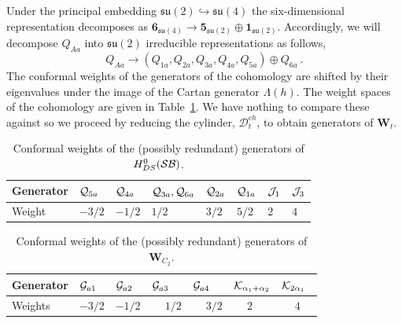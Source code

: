 \documentclass[a4paper]{article}
\def\BB{{\cal B}}
\def\GG{{\cal G}}
\def\JJ{{\cal J}}
\def\KK{{\cal K}}
\def\QQ{{\cal Q}}
\def\SS{{\cal S}}
\def\suf{\mathfrak{su}}
\def\D{\mathcal{D}^{ch}}
\def\W{\mathbf{W}}
\begin{document}
Under the principal embedding $\suf(2)\hookrightarrow\suf(4)$ the six-dimensional representation decomposes as $\mathbf{6}_{\suf(4)}\to\mathbf{5}_{\suf(2)}\oplus \mathbf{1}_{\suf(2)}$. Accordingly, we will decompose $Q_{Aa}$ into $\suf(2)$ irreducible representations as follows,
\begin{equation}
	Q_{Aa} \rightarrow \left(Q_{1a} , Q_{2a}, Q_{3a}, Q_{4a}, Q_{5a} \right) \oplus Q_{6a}~.
\end{equation}
The conformal weights of the generators of the cohomology are shifted by their eigenvalues under the image of the Cartan generator $\Lambda(h)$. The weight spaces of the cohomology are given in Table~\ref{tab:D3-DS}. We have nothing to compare these against so we proceed by reducing the cylinder, $\D_t$, to obtain generators of $\W_t$.

\begin{table}[t!]
\centering
\renewcommand{\arraystretch}{1.25}
\begin{tabular}{|>{\centering}m{2cm} | >{\centering}m{1cm} | >{\centering}m{1cm} | >{\centering}m{1.5cm} | >{\centering}m{1cm} | >{\centering}m{1cm} | >{\centering}m{1cm} |>{\centering\arraybackslash}m{1cm} |}
\hline
Generator & $\QQ_{5a}$ & $\QQ_{4a}$ & $\QQ_{3a},\QQ_{6a}$ & $\QQ_{2a}$ & $\QQ_{1a}$ & $\JJ_1$ & $\JJ_3$ \\
\hline
Weight & $-3/2$ & $-1/2$ & $1/2$ & $3/2$ & $5/2$& $2$ & $4$\\
\hline
\end{tabular}
\caption{Conformal weights of the (possibly redundant) generators of $H^0_{DS}(\SS\BB)$.}
\label{tab:D3-DS}
\end{table}

\begin{table}[b!]
\renewcommand{\arraystretch}{1.25}
\centering
\begin{tabular}{|>{\centering}m{2.5cm} | >{\centering}m{1.5cm} | >{\centering}m{1.5cm} | >{\centering}m{1.5cm} | >{\centering}m{1.5cm} | >{\centering}m{1.5cm} | >{\centering\arraybackslash}m{1.5cm} |}
\hline
Generator & $\GG_{a1}$ & $\GG_{a2}$ & $\GG_{a3}$ & $\GG_{a4}$ & $\KK_{\alpha_1+\alpha_2}$ & $\KK_{2\alpha_1}$ \\
\hline
Weights & $-3/2$ & $-1/2$ & $\phantom{-}1/2$ & $\phantom{-}3/2$& $\phantom{-}2\phantom{/2}$ & $\phantom{-}4\phantom{/2}$\\
\hline
\end{tabular}
\caption{Conformal weights of the (possibly redundant) generators of $\W_{C_2}$.}
\label{tab:C2_DS}
\end{table}
\end{document}

